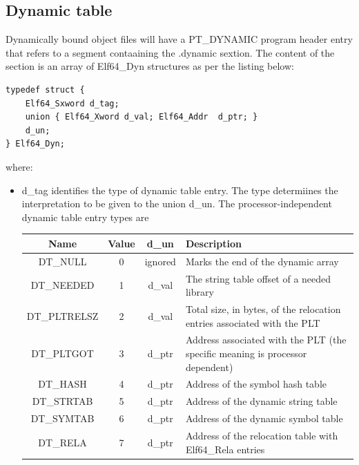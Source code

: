 \subsection{Dynamic table}
Dynamically bound object files will have a {\ttfamily PT\_DYNAMIC} program header entry that refers to a segment contaaining the {\ttfamily .dynamic} sextion. The content of the section is an array of {\ttfamily Elf64\_Dyn} structures as per the listing below:
\begin{lstlisting}[style=ansic, caption={Dynamic Table Structure}, label=elf64dyn]
typedef struct {
    Elf64_Sxword d_tag;
    union { Elf64_Xword d_val; Elf64_Addr  d_ptr; } 
    d_un;
} Elf64_Dyn;
\end{lstlisting} 
where:
\begin{itemize}
    \item {\ttfamily d\_tag} identifies the type of dynamic table entry. The type determiines the interpretation to be given to the union {\ttfamily d\_un}. The processor-independent dynamic table entry types are
    \begin{table}[!htbp]
        \begin{center}
            \begin{tabular}{|c|c|c|p{10cm}|}
                \hline \textbf{Name} & \textbf{Value} & \textbf{d\_un} & \textbf{Description}\\
                \hline {\ttfamily DT\_NULL} & 0 & ignored & Marks the end of the dynamic array\\
                \hline {\ttfamily DT\_NEEDED} & 1 & {\ttfamily d\_val} & The string table offset of a needed library\\
                \hline {\ttfamily DT\_PLTRELSZ} & 2 & {\ttfamily d\_val} & Total size, in bytes, of the relocation entries associated with the PLT\\
                \hline {\ttfamily DT\_PLTGOT} & 3 & {\ttfamily d\_ptr} & Address associated with the PLT (the specific meaning is processor dependent)\\
                \hline {\ttfamily DT\_HASH} & 4 & {\ttfamily d\_ptr} & Address of the symbol hash table\\
                \hline {\ttfamily DT\_STRTAB} & 5 & {\ttfamily d\_ptr} & Address of the dynamic string table\\
                \hline {\ttfamily DT\_SYMTAB} & 6 & {\ttfamily d\_ptr} & Address of the dynamic symbol table\\
                \hline {\ttfamily DT\_RELA} & 7 & {\ttfamily d\_ptr} & Address of the relocation table with {\ttfamily Elf64\_Rela} entries\\

\end{tabular}
\end{center}
\end{table}
\end{itemize}
